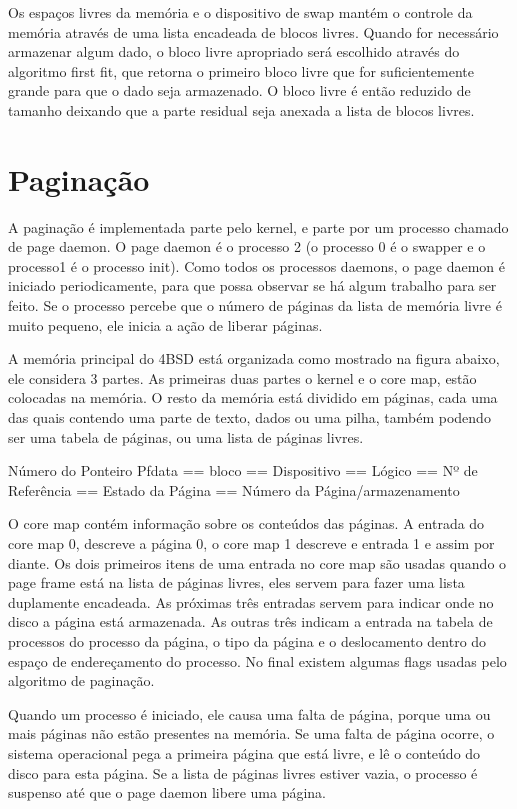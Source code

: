 Os espaços livres da memória e o dispositivo de swap mantém o controle da memória através de uma lista encadeada de blocos livres. Quando for necessário armazenar algum dado, o bloco livre apropriado será escolhido através do algoritmo first fit, que retorna o primeiro bloco livre que for suficientemente grande para que o dado seja armazenado. O bloco livre é então reduzido de tamanho deixando que a parte residual seja anexada a lista de blocos livres.

\section{Paginação}

A paginação é implementada parte pelo kernel, e parte por um processo chamado de page daemon. O page daemon é o processo 2 (o processo 0 é o swapper e o processo1 é o processo init). Como todos os processos daemons, o page daemon é iniciado periodicamente, para que possa observar se há algum trabalho para ser feito. Se o processo percebe que o número de páginas da lista de memória livre é muito pequeno, ele inicia a ação de liberar páginas.

A memória principal do 4BSD está organizada como mostrado na figura abaixo, ele considera 3 partes. As primeiras duas partes o kernel e o core map, estão colocadas na memória. O resto da memória está dividido em páginas, cada uma das quais contendo uma parte de texto, dados ou uma pilha, também podendo ser uma tabela de páginas, ou uma lista de páginas livres.

Número do Ponteiro Pfdata == bloco == Dispositivo == Lógico == Nº de Referência == Estado da Página == Número da Página/armazenamento

O core map contém informação sobre os conteúdos das páginas. A entrada do core map 0, descreve a página 0, o core map 1 descreve e entrada 1 e assim por diante. Os dois primeiros itens de uma entrada no core map são usadas quando o page frame está na lista de páginas livres, eles servem para fazer uma lista duplamente encadeada. As próximas três entradas servem para indicar onde no disco a página está armazenada. As outras três indicam a entrada na tabela de processos do processo da página, o tipo da página e o deslocamento dentro do espaço de endereçamento do processo. No final existem algumas flags usadas pelo algoritmo de paginação.

Quando um processo é iniciado, ele causa uma falta de página, porque uma ou mais páginas não estão presentes na memória. Se uma falta de página ocorre, o sistema operacional pega a primeira página que está livre, e lê o conteúdo do disco para esta página. Se a lista de páginas livres estiver vazia, o processo é suspenso até que o page daemon libere uma página.

